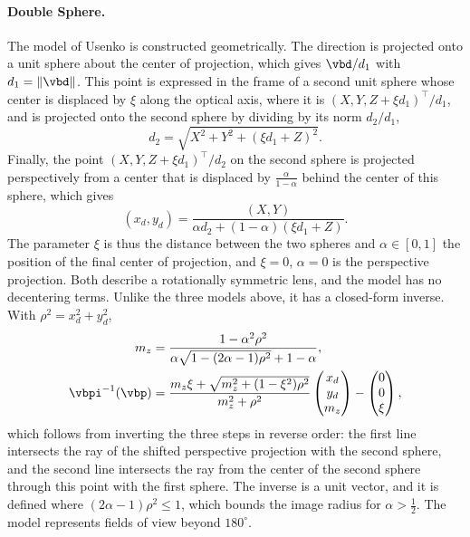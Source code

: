 \paragraph{Double Sphere.} The model of Usenko \etal
\cite{double-sphere} is constructed geometrically. The direction is
projected onto a unit sphere about the center of projection, which
gives $\vbd/d_1$ with $d_1=\lVert\vbd\rVert$. This point is expressed
in the frame of a second unit sphere whose center is displaced by
$\xi$ along the optical axis, where it is
$(X,Y,Z+\xi d_1)^\top/d_1$, and is projected onto the second sphere
by dividing by its norm $d_2/d_1$,
\begin{equation}
    d_2=\sqrt{X^2+Y^2+(\xi d_1+Z)^2}.
\end{equation}
Finally, the point $(X,Y,Z+\xi d_1)^\top/d_2$ on the second sphere is
projected perspectively from a center that is displaced by
$\frac{\alpha}{1-\alpha}$ behind the center of this sphere, which
gives
\begin{equation}
\label{eq:supp-double-sphere}
    (x_d,y_d) = \frac{(X,Y)}{\alpha d_2+(1-\alpha)(\xi d_1+Z)}.
\end{equation}
The parameter $\xi$ is thus the distance between the two spheres and
$\alpha\in[0,1]$ the position of the final center of projection, and
$\xi=0$, $\alpha=0$ is the perspective projection. Both describe a
rotationally symmetric lens, and the model has no decentering terms.
Unlike the three models above, it has a closed-form inverse. With
$\rho^2=x_d^2+y_d^2$,
\begin{align}
\label{eq:supp-double-sphere-inverse}
    m_z &= \frac{1-\alpha^2\rho^2}{\alpha\sqrt{1-(2\alpha-1)\rho^2}+1-\alpha},\nonumber\\
    \vbpi^{-1}(\vbp) &= \frac{m_z\xi+\sqrt{m_z^2+(1-\xi^2)\rho^2}}{m_z^2+\rho^2}
    \begin{pmatrix}x_d\\y_d\\m_z\end{pmatrix}
    -\begin{pmatrix}0\\0\\\xi\end{pmatrix},
\end{align}
which follows from inverting the three steps in reverse order: the
first line intersects the ray of the shifted perspective projection
with the second sphere, and the second line intersects the ray from
the center of the second sphere through this point with the first
sphere. The inverse is a unit vector, and it is defined where
$(2\alpha-1)\rho^2\le1$, which bounds the image radius for
$\alpha>\frac{1}{2}$. The model represents fields of view beyond
$180^\circ$.

